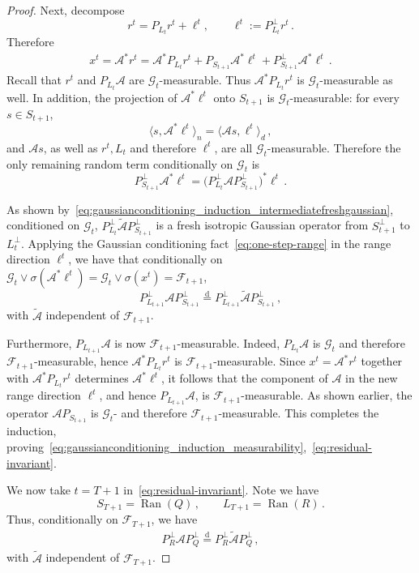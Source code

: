 \documentclass[11pt]{article}
\theoremstyle{definition}
\theoremstyle{remark}
\numberwithin{equation}{section}
\numberwithin{theorem}{section}
\newcommand{\cA}{\mathcal A}
\begin{document}
\begin{proof}
Next, decompose
\[
  r^t=P_{L_t}r^t+\ell^t,
  \qquad
  \ell^t:=P_{L_t}^\perp r^t\,.
\]
Therefore
\begin{align*}
x^t = \mathcal A^*r^t = \mathcal A^*P_{L_t}r^t + P_{S_{t+1}} \cA^* \ell^t  + P_{S_{t+1}}^\perp \cA^* \ell^t\,.
\end{align*}
Recall that $r^t$ and $P_{L_t}\mathcal A$ are $\mathscr G_t$-measurable. Thus $\mathcal A^*P_{L_t}r^t$ is $\mathscr G_t$-measurable as well. In addition, the projection of $\mathcal A^*\ell^t$ onto $S_{t+1}$ is $\mathscr G_t$-measurable: for every $s\in S_{t+1}$,
\[
  \langle s,\mathcal A^*\ell^t\rangle_{n}
  =
  \langle \mathcal A s,\ell^t\rangle_{d}\,,
\]
and $\mathcal A s$, as well as $r^t, L_t$ and therefore $\ell^t$, are all $\mathscr G_t$-measurable. Therefore the only remaining random term conditionally on $\mathscr G_t$ is
\[
  P_{S_{t+1}}^\perp\mathcal A^*\ell^t
  =
  \big(P_{L_t}^\perp\mathcal A P_{S_{t+1}}^\perp\big)^*\ell^t\,.
\]

As shown by~\eqref{eq:gaussianconditioning_induction_intermediatefreshgaussian}, conditioned on $\mathscr G_t$, $P_{L_t}^\perp \widetilde{\mathcal A} P_{S_{t+1}}^\perp$ is a fresh isotropic Gaussian operator from $S_{t+1}^\perp$ to $L_t^\perp$. Applying the Gaussian conditioning fact~\eqref{eq:one-step-range} in the range direction $\ell^t$, we have that conditionally on
$\mathscr G_t\vee \sigma(\cA^* \ell^t) = \mathscr G_t\vee\sigma(x^t) = \mathscr F_{t+1}$,
\[
  P_{L_{t+1}}^\perp \mathcal A P_{S_{t+1}}^\perp
  \stackrel{\mathrm d}{=}
  P_{L_{t+1}}^\perp \widetilde{\mathcal A}P_{S_{t+1}}^\perp\,,
\]
with $\widetilde{\mathcal A}$ independent of $\mathscr F_{t+1}$.

Furthermore, $P_{L_{t+1}}\mathcal A$ is now $\mathscr F_{t+1}$-measurable. Indeed, $P_{L_t}\mathcal A$ is $\mathscr G_t$ and therefore $\mathscr F_{t+1}$-measurable, hence $\mathcal A^*P_{L_t}r^t$ is $\mathscr F_{t+1}$-measurable. Since $x^t=\mathcal A^*r^t$ together with $\mathcal A^*P_{L_t}r^t$ determines $\mathcal A^*\ell^t$, it follows that the component of $\mathcal A$ in the new range direction $\ell^t$, and hence $P_{L_{t+1}}\mathcal A$, is $\mathscr F_{t+1}$-measurable. As shown earlier, the operator $\mathcal A P_{S_{t+1}}$ is $\mathscr G_t$- and therefore $\mathscr F_{t+1}$-measurable. This completes the induction, proving~\eqref{eq:gaussianconditioning_induction_measurability},~\eqref{eq:residual-invariant}.

We now take $t=T+1$ in~\eqref{eq:residual-invariant}. Note we have
\[
  S_{T+1}=\operatorname{Ran}(Q)\,,
  \qquad
  L_{T+1}=\operatorname{Ran}(R)\,.
\]
Thus, conditionally on $\mathscr F_{T+1}$, we have
\begin{align}\label{eq:residual-invariant-result}
  P_R^\perp \mathcal A P_Q^\perp
  \stackrel{\mathrm d}{=}
  P_R^\perp\widetilde{\mathcal A}P_Q^\perp\,,
\end{align}
with $\widetilde{\mathcal A}$ independent of $\mathscr F_{T+1}$.


\end{proof}
\end{document}
